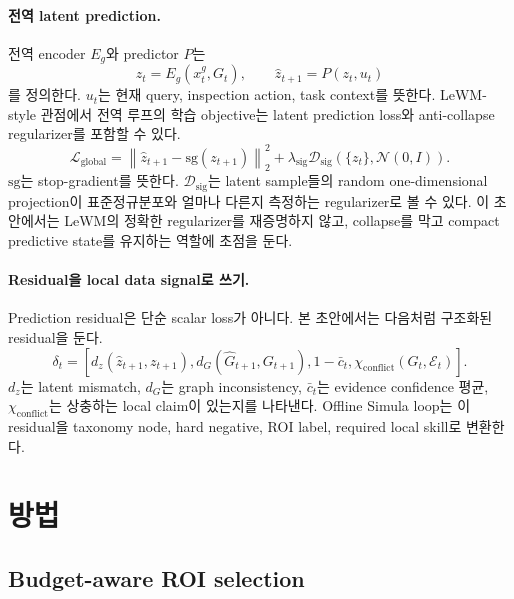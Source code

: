 \documentclass[11pt]{article}
\theoremstyle{definition}
\begin{document}
\paragraph{전역 latent prediction.}
전역 encoder $E_g$와 predictor $P$는
\begin{equation}
  z_t = E_g(x_t^g,G_t), \qquad
  \hat z_{t+1}=P(z_t,u_t)
\end{equation}
를 정의한다.
$u_t$는 현재 query, inspection action, task context를 뜻한다.
LeWM-style 관점에서 전역 루프의 학습 objective는 latent prediction loss와 anti-collapse regularizer를 포함할 수 있다.
\begin{equation}
  \mathcal{L}_{\mathrm{global}}
  =
  \left\|\hat z_{t+1} - \mathrm{sg}(z_{t+1})\right\|_2^2
  +
  \lambda_{\mathrm{sig}}\mathcal{D}_{\mathrm{sig}}(\{z_t\},\mathcal{N}(0,I)).
  \label{eq:global-loss-ko}
\end{equation}
$\mathrm{sg}$는 stop-gradient를 뜻한다.
$\mathcal{D}_{\mathrm{sig}}$는 latent sample들의 random one-dimensional projection이 표준정규분포와 얼마나 다른지 측정하는 regularizer로 볼 수 있다.
이 초안에서는 LeWM의 정확한 regularizer를 재증명하지 않고, collapse를 막고 compact predictive state를 유지하는 역할에 초점을 둔다.

\paragraph{Residual을 local data signal로 쓰기.}
Prediction residual은 단순 scalar loss가 아니다.
본 초안에서는 다음처럼 구조화된 residual을 둔다.
\begin{equation}
  \delta_t =
  \left[
  d_z(\hat z_{t+1},z_{t+1}),
  d_G(\hat G_{t+1},G_{t+1}),
  1-\bar c_t,
  \chi_{\mathrm{conflict}}(G_t,\mathcal{E}_t)
  \right].
  \label{eq:residual-ko}
\end{equation}
$d_z$는 latent mismatch, $d_G$는 graph inconsistency, $\bar c_t$는 evidence confidence 평균, $\chi_{\mathrm{conflict}}$는 상충하는 local claim이 있는지를 나타낸다.
Offline Simula loop는 이 residual을 taxonomy node, hard negative, ROI label, required local skill로 변환한다.

\section{방법}

\subsection{Budget-aware ROI selection}
\end{document}
